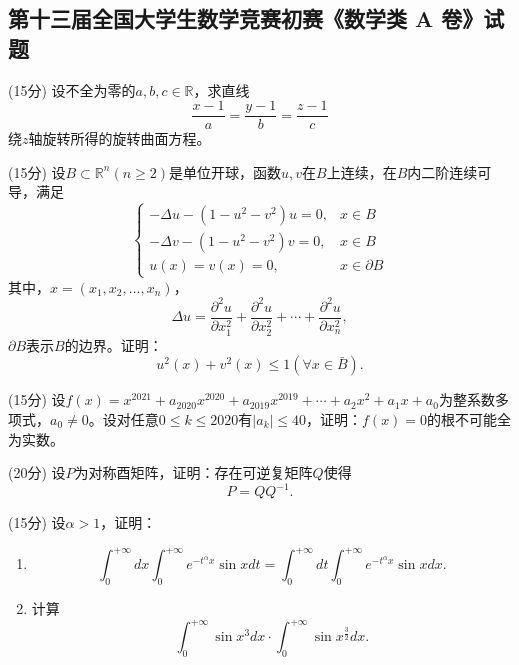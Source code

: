 \documentclass[loose]{ExBook}
\begin{document}
\subsection{第十三届全国大学生数学竞赛初赛《数学类 A 卷》试题}
\begin{qitems}
    \begin{bbox}
        \qitem (15分) 设不全为零的$a,b,c\in\mathbb{R}$，求直线
        \[
        \frac{x-1}{a} = \frac{y-1}{b} = \frac{z-1}{c}
        \]
        绕$z$轴旋转所得的旋转曲面方程。
    \end{bbox}

    \begin{bbox}
        \qitem (15分) 设$B\subset\mathbb{R}^n(n\geq2)$是单位开球，函数$u,v$在$B$上连续，在$B$内二阶连续可导，满足
        \[
        \begin{cases}
        -\Delta u - (1 - u^2 - v^2)u = 0, & x \in B \\
        -\Delta v - (1 - u^2 - v^2)v = 0, & x \in B \\
        u(x) = v(x) = 0, & x \in \partial B
        \end{cases}
        \]
        其中，$x = (x_1, x_2, \ldots, x_n)$，
        \[
        \Delta u = \frac{\partial^2 u}{\partial x_1^2} + \frac{\partial^2 u}{\partial x_2^2} + \cdots + \frac{\partial^2 u}{\partial x_n^2},
        \]
        $\partial B$表示$B$的边界。证明：
        \[
        u^2(x) + v^2(x) \leq 1 (\forall x \in \bar{B}).
        \]
    \end{bbox}

    \begin{bbox}
        \qitem (15分) 设$f(x) = x^{2021} + a_{2020}x^{2020} + a_{2019}x^{2019} + \cdots + a_2x^2 + a_1x + a_0$为整系数多项式，$a_0 \neq 0$。设对任意$0\leq k\leq2020$有$|a_k| \leq 40$，证明：$f(x) = 0$的根不可能全为实数。
    \end{bbox}

    \begin{bbox}
        \qitem (20分) 设$P$为对称酉矩阵，证明：存在可逆复矩阵$Q$使得
        \[
        P = QQ^{-1}.
        \]
    \end{bbox}

    \begin{bbox}
        \qitem (15分) 设$\alpha > 1$，证明：
        \begin{enumerate}[label=(\arabic*)]
            \item 
            \[
            \int_{0}^{+\infty} dx \int_{0}^{+\infty} e^{-t^\alpha x} \sin x dt = \int_{0}^{+\infty} dt \int_{0}^{+\infty} e^{-t^\alpha x} \sin x dx.
            \]
            \item 计算
            \[
            \int_{0}^{+\infty} \sin x^3 dx \cdot \int_{0}^{+\infty} \sin x^{\frac{3}{2}} dx.
            \]
        \end{enumerate}
    \end{bbox}


\end{qitems}
\end{document}
